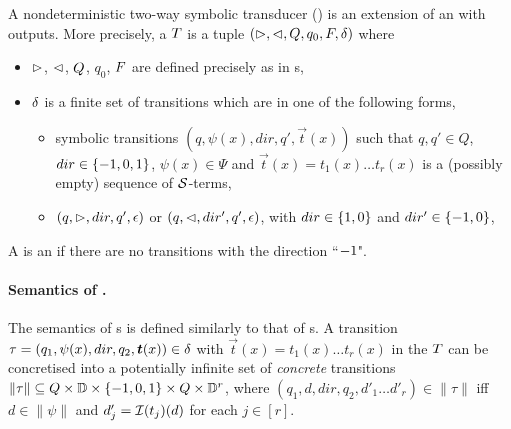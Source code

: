 \begin{definition}
    A nondeterministic two-way symbolic transducer (\SST) is an extension of an \SSA{} with outputs. More precisely, a \SST{} $T$ is a tuple $(\vartriangleright, \vartriangleleft, Q, q_0, F, \delta)$ where  
\begin{itemize}
%
\item $\vartriangleright$, $\vartriangleleft$, $Q$, $q_0$, $F$ are defined precisely as in \SSA{}s, 
%
\item $\delta$ is a finite set of  transitions which are in one of the following forms,
\begin{itemize}
\item  symbolic transitions $(q, \psi(x), dir, q', \vec{t}(x))$ such that $q, q' \in Q$, $dir \in \{-1, 0, 1\}$, $\psi(x) \in \Psi$ and
$\vec{t}(x) = t_1(x) \ldots t_r(x)$ is a (possibly empty) sequence of $\mathcal{S}$-terms, 
\item   $(q, \vartriangleright, dir, q', \epsilon)$ or $(q, \vartriangleleft, dir', q', \epsilon)$, with $dir \in \{1, 0\}$ and $dir' \in \{-1, 0\}$,
\end{itemize}
\end{itemize}
A \SST{} is an \ST{} if there are no transitions with the direction ``$-1$". 
\end{definition}

\paragraph{Semantics of \SST{}.}
The semantics of \SST{}s is defined similarly to that of \SSA{}s. 
A transition $\tau=(q_1,\psi(x), dir, q_2, \vec{t}(x)) \in \transrel$ with $\vec{t}(x) = t_1(x) \ldots t_r(x)$ in the \SST{} $T$ can be concretised
into a potentially infinite set of \emph{concrete} transitions $\|\tau\| \subseteq Q \times \mathbb{D} \times \{-1, 0, 1\} \times Q \times \mathbb{D}^r$, where $(q_1, d, dir, q_2, d'_1\ldots d'_r)  \in \|\tau\|$ iff $d \in \|\psi\|$ and $d'_j = \mathcal{I}(t_j)(d)$ for each $j \in [r]$.

